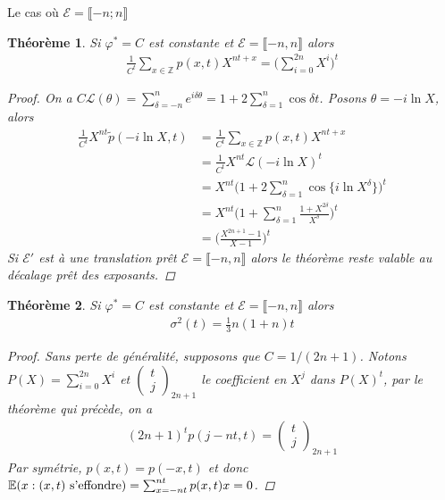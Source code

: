 \documentclass{article}
\newtheorem{theorem}{Théorème}[section]
\begin{document}
\begin{section}{Le cas où $\mathcal{E} = \llbracket -n; n\rrbracket$}
\begin{theorem}
	Si $\varphi^*=C$ est constante et $\mathcal{E} = \llbracket -n,n\rrbracket$ alors 
	\begin{align*}
	  \frac{1}{C^t} \sum_{x\in\mathbb{Z}}p(x,t) X^{nt+x} = \bigg(\sum_{i=0}^{2n} X^i\bigg)^t\end{align*}
	  \begin{proof}
		  On a $C\mathcal{L}(\theta) = \sum_{\delta=-n}^{n} e^{i\delta \theta} = 1 + 2\sum_{\delta=1}^n \cos \delta t$. Posons $\theta = -i \ln X$, alors
		  \begin{align*}
			  \frac{1}{C^t}X^{n t} \tilde{p}(-i \ln{X},t)  &= \frac{1}{C^t}\sum_{x\in\mathbb{Z}}p(x,t) X^{nt+x}\\
								       &= \frac{1}{C^t}X^{n t}\mathcal{L}(-i \ln{X})^t\\
						      &=X^{n t}\bigg(1+2\sum_{\delta=1}^n \cos\{i \ln{X^{\delta}}\}\bigg)^t\\
						      &=X^{n t}\bigg(1+\sum_{\delta=1}^n \frac{1+X^{2\delta}}{X^{\delta}}\bigg)^t\\
						      &=\bigg(\frac{X^{2n+1}-1}{X-1}\bigg)^t
		  \end{align*}
		  Si $\mathcal{E}'$ est à une translation prêt $\mathcal{E}=\llbracket -n,n\rrbracket$ alors le théorème reste valable au décalage prêt des exposants.

	  \end{proof}
\end{theorem}
\begin{theorem}
	Si $\varphi^*=C$ est constante et $\mathcal{E} = \llbracket -n, n\rrbracket$ alors 
	\begin{align*}
		\sigma^2(t) = \frac{1}{3} n (1+n) t
	\end{align*}
	\begin{proof}
		Sans perte de généralité, supposons que $C=1/(2n+1)$. Notons $P(X) = \sum_{i=0}^{2n} X^i$ et $\begin{pmatrix}t\\j\end{pmatrix}_{2n+1}$ le coefficient en $X^j$ dans $P(X)^t$, par le théorème qui précède, on a
		\begin{align*}
			(2n+1)^t p(j-nt,t) = \begin{pmatrix} t\\j \end{pmatrix}_{2n+1}
		\end{align*}
		Par symétrie, $p(x,t) = p(-x,t)$ et donc $\mathbb{E}(x : (x,t) \textup{ s'effondre}) = \sum_{x=-n t}^{n t} p(x,t) x = 0$.


\end{proof}
\end{theorem}
\end{section}
\end{document}
